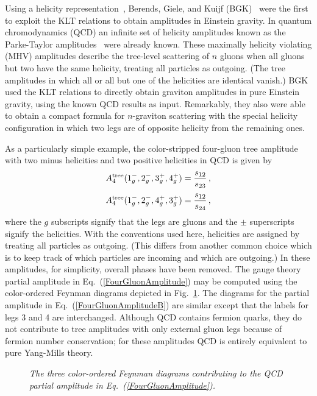 \documentclass[12pt]{livrev}
\begin{document}
Using a helicity representation~\cite{Causmaecker81,Kleiss85,Xu87},
Berends, Giele, and Kuijf (BGK)~\cite{BGK} were the first to exploit
the KLT relations to obtain amplitudes in Einstein gravity.  In
quantum chromodynamics (QCD) an infinite set of helicity amplitudes
known as the Parke-Taylor
amplitudes~\cite{ParkeTaylor86,BerendsGiele88,Kosower90LightCone} were
already known.  These maximally helicity violating (MHV) amplitudes
describe the tree-level scattering of $n$ gluons when all gluons but
two have the same helicity, treating all particles as outgoing.  (The
tree amplitudes in which all or all but one of the helicities are
identical vanish.)  BGK used the KLT relations to directly obtain
graviton amplitudes in pure Einstein gravity, using the known QCD
results as input.  Remarkably, they also were able to obtain a compact
formula for $n$-graviton scattering with the special helicity
configuration in which two legs are of opposite helicity from the
remaining ones.


As a particularly simple example, the color-stripped four-gluon tree 
amplitude with two minus helicities and two positive helicities
in QCD is given by
%
\begin{equation}
A_4^{\rm tree}(1^-_g, 2^-_g, 3^+_g, 4^+_g) =  {s_{12} \over s_{23}} \,,
\label{FourGluonAmplitude}
\end{equation}
%
\begin{equation}
A_4^{\rm tree}(1^-_g, 2^-_g, 4^+_g, 3^+_g) =  {s_{12} \over s_{24}} \,,
\label{FourGluonAmplitudeB}
\end{equation}
%
where the $g$ subscripts signify that the legs are gluons and the
$\pm$ superscripts signify the helicities.  With the conventions used
here, helicities are assigned by treating all particles as
outgoing.  (This differs from another common choice which is to keep
track of which particles are incoming and which are outgoing.)  In
these amplitudes, for simplicity, overall phases have been  removed.  The
gauge theory partial amplitude in Eq.~(\ref{FourGluonAmplitude}) may
be computed using the color-ordered Feynman diagrams depicted in
Fig.~\ref{figure:Gluon}.  The diagrams for the partial amplitude in
Eq.~(\ref{FourGluonAmplitudeB}) are similar except that the labels for
legs 3 and 4 are interchanged. Although QCD contains fermion quarks,
they do not contribute to tree amplitudes with only external gluon legs
because of fermion number conservation; for these amplitudes QCD is
entirely equivalent to pure Yang-Mills theory.


\begin{figure}[h]
  \def\epsfsize#1#2{0.9#1} \centerline{}
  \caption{\it The three color-ordered Feynman diagrams contributing to 
         the QCD partial amplitude in Eq.~(\ref{FourGluonAmplitude}).}
  \label{figure:Gluon}
\end{figure}
\end{document}
